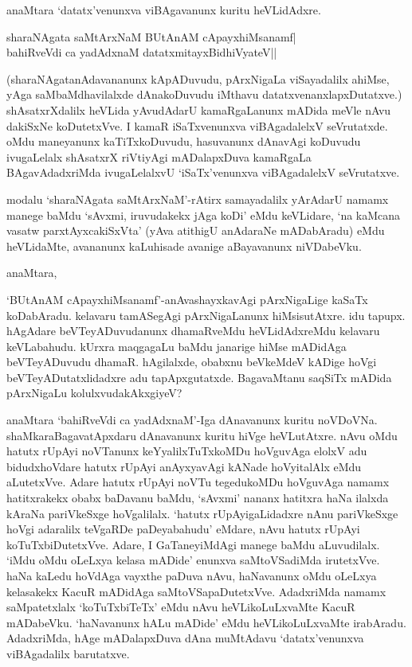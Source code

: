anaMtara `datatx'venunxva viBAgavanunx kuritu heVLidAdxre.

\begin{shloka}
sharaNAgata saMtArxNaM BUtAnAM cApayxhiMsanamf|\\
bahiRveVdi ca yadAdxnaM datatxmitayxBidhiVyateV||
\end{shloka}

(sharaNAgatanAdavananunx kApADuvudu, pArxNigaLa viSayadalilx ahiMse, yAga saMbaMdhavilalxde dAnakoDuvudu iMthavu datatxvenanxlapxDutatxve.) shAsatxrXdalilx heVLida yAvudAdarU kamaRgaLanunx mADida meVle nAvu dakiSxNe koDutetxVve. I kamaR iSaTxvenunxva viBAgadalelxV seVrutatxde. oMdu maneyanunx kaTiTxkoDuvudu, hasuvanunx dAnavAgi koDuvudu ivugaLelalx shAsatxrX riVtiyAgi mADalapxDuva kamaRgaLa BAgavAdadxriMda ivugaLelalxvU `iSaTx'venunxva viBAgadalelxV seVrutatxve.

modalu `sharaNAgata saMtArxNaM'-rAtirx samayadalilx yArAdarU namamx manege baMdu `sAvxmi, iruvudakekx jAga koDi' eMdu keVLidare, `na kaMcana vasatw parxtAyxcakiSxVta' (yAva atithigU anAdaraNe mADabAradu) eMdu heVLidaMte, avananunx kaLuhisade avanige aBayavanunx niVDabeVku. 

anaMtara,

`BUtAnAM cApayxhiMsanamf'-anAvashayxkavAgi pArxNigaLige kaSaTx koDabAradu. kelavaru tamASegAgi pArxNigaLanunx hiMsisutAtxre. idu tapupx. hAgAdare beVTeyADuvudanunx dhamaRveMdu heVLidAdxreMdu kelavaru keVLabahudu. kUrxra maqgagaLu baMdu janarige hiMse mADidAga beVTeyADuvudu dhamaR. hAgilalxde, obabxnu beVkeMdeV kADige hoVgi beVTeyADutatxlidadxre adu tapApxgutatxde. BagavaMtanu saqSiTx mADida pArxNigaLu kolulxvudakAkxgiyeV?

anaMtara `bahiRveVdi ca yadAdxnaM'-Iga dAnavanunx kuritu noVDoVNa. shaMkaraBagavatApxdaru dAnavanunx kuritu hiVge heVLutAtxre. nAvu oMdu hatutx rUpAyi noVTanunx keYyalilxTuTxkoMDu hoVguvAga elolxV adu bidudxhoVdare hatutx rUpAyi anAyxyavAgi kANade hoVyitalAlx eMdu aLutetxVve. Adare hatutx rUpAyi noVTu tegedukoMDu hoVguvAga namamx hatitxrakekx obabx baDavanu baMdu, `sAvxmi' nananx hatitxra haNa ilalxda kAraNa pariVkeSxge hoVgalilalx. `hatutx rUpAyigaLidadxre nAnu pariVkeSxge hoVgi adaralilx teVgaRDe paDeyabahudu' eMdare, nAvu hatutx rUpAyi koTuTxbiDutetxVve. Adare, I GaTaneyiMdAgi manege baMdu aLuvudilalx. `iMdu oMdu oLeLxya kelasa mADide' enunxva saMtoVSadiMda irutetxVve. haNa kaLedu hoVdAga vayxthe paDuva nAvu, haNavanunx oMdu oLeLxya kelasakekx KacuR mADidAga saMtoVSapaDutetxVve. AdadxriMda namamx saMpatetxlalx `koTuTxbiTeTx' eMdu nAvu heVLikoLuLxvaMte KacuR mADabeVku. `haNavanunx hALu mADide' eMdu heVLikoLuLxvaMte irabAradu. AdadxriMda, hAge mADalapxDuva dAna muMtAdavu `datatx'venunxva viBAgadalilx barutatxve.

